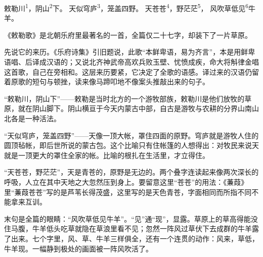 
\begin{poem}
敕勒川\textsuperscript{1}，阴山\textsuperscript{2}下。
天似穹庐\textsuperscript{3}，笼盖四野。
天苍苍\textsuperscript{4}，野茫茫\textsuperscript{5}，
风吹草低见\textsuperscript{6}牛羊。
\end{poem}

\begin{annotations}
\end{annotations}

\begin{appreciation}
《敕勒歌》是北朝乐府里最著名的一首，全篇仅二十七字，却装下了一片草原。

先说它的来历。《乐府诗集》引旧题说，此歌“本鲜卑语，易为齐言”，本是用鲜卑语唱、后译成汉语的；又说北齐神武帝高欢兵败玉壁、忧愤成疾，命大将斛律金唱这首歌，自己在旁相和。这层来历要紧，它决定了全歌的语感。译过来的汉语仍留着原歌的短句与顿挫，读来像马蹄叩地不像案头推敲出来的句子。

“敕勒川，阴山下”——敕勒是当时北方的一个游牧部族，敕勒川是他们放牧的草原，就在阴山脚下。阴山横亘于今天内蒙古中部，自古是游牧与农耕的分界山南山北各是一种活法。

“天似穹庐，笼盖四野”——天像一顶大帐，罩住四面的原野。穹庐就是游牧人住的圆顶毡帐，即后世所说的蒙古包。这个比喻只有住帐篷的人想得出：对牧民来说天就是一顶更大的罩住全家的帐。比喻的根扎在生活里，才立得住。

“天苍苍，野茫茫”，天是青苍的，原野是无边的。两个叠字连读起来像两次深长的呼吸，人立在其中天地之大忽然压到身上。要留意这里“苍苍”的用法：《蒹葭》里“蒹葭苍苍”写的是芦苇长得茂盛，这里写的是天色青苍，字面相同而所指不同不能拿来互训。

末句是全篇的眼睛：“风吹草低见牛羊”。“见”通“现”，显露。草原上的草高得能没住马腹，牛羊低头吃草就隐在草浪里看不见；忽然一阵风过草伏下去成群的牛羊露了出来。七个字里，风、草、牛羊三样俱全，还有一个连贯的动作：风来，草低，牛羊现。一幅静到极处的画面被一阵风吹活了。
\end{appreciation}
